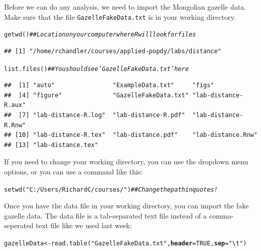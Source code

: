 \documentclass[12pt]{article}\usepackage[]{graphicx}\usepackage[]{color}
\makeatletter
\newcommand{\hlnum}[1]{\textcolor[rgb]{0.69,0.494,0}{#1}}%
\newcommand{\hlstr}[1]{\textcolor[rgb]{0.749,0.012,0.012}{#1}}%
\newcommand{\hlcom}[1]{\textcolor[rgb]{0.514,0.506,0.514}{\textit{#1}}}%
\newcommand{\hlstd}[1]{\textcolor[rgb]{0,0,0}{#1}}%
\newcommand{\hlkwb}[1]{\textcolor[rgb]{0,0.341,0.682}{#1}}%
\newcommand{\hlkwc}[1]{\textcolor[rgb]{0,0,0}{\textbf{#1}}}%
\newcommand{\hlkwd}[1]{\textcolor[rgb]{0.004,0.004,0.506}{#1}}%
\newenvironment{kframe}{%
 \def\at@end@of@kframe{}%
 \ifinner\ifhmode%
  \def\at@end@of@kframe{\end{minipage}}%
  \begin{minipage}{\columnwidth}%
 \fi\fi%
 \def\FrameCommand##1{\hskip\@totalleftmargin \hskip-\fboxsep
 \colorbox{shadecolor}{##1}\hskip-\fboxsep
     \hskip-\linewidth \hskip-\@totalleftmargin \hskip\columnwidth}%
 \MakeFramed {\advance\hsize-\width
   \@totalleftmargin\z@ \linewidth\hsize
   \@setminipage}}%
 {\par\unskip\endMakeFramed%
 \at@end@of@kframe}
\newenvironment{knitrout}{}{} %
\makeatother
\begin{document}
Before we can do any analysis, we need to import the Mongolian gazelle
data. Make sure that the file \texttt{GazelleFakeData.txt} is in your
working directory.

\begin{knitrout}
\color{fgcolor}\begin{kframe}
\begin{alltt}
\hlkwd{getwd}\hlstd{()}       \hlcom{## Location on your computer where R will look for files}
\end{alltt}
\begin{verbatim}
## [1] "/home/rchandler/courses/applied-popdy/labs/distance"
\end{verbatim}
\begin{alltt}
\hlkwd{list.files}\hlstd{()}  \hlcom{## You should see 'GazelleFakeData.txt' here}
\end{alltt}
\begin{verbatim}
##  [1] "auto"                "ExampleData.txt"     "figs"               
##  [4] "figure"              "GazelleFakeData.txt" "lab-distance-R.aux" 
##  [7] "lab-distance-R.log"  "lab-distance-R.pdf"  "lab-distance-R.Rnw" 
## [10] "lab-distance-R.tex"  "lab-distance.pdf"    "lab-distance.Rnw"   
## [13] "lab-distance.tex"
\end{verbatim}
\end{kframe}
\end{knitrout}

If you need to change your working directory, you can use the dropdown
menu options, or you can use a command like this:

\begin{knitrout}
\color{fgcolor}\begin{kframe}
\begin{alltt}
\hlkwd{setwd}\hlstd{(}\hlstr{"C:/Users/RichardC/courses/"}\hlstd{)} \hlcom{## Change the path in quotes!}
\end{alltt}
\end{kframe}
\end{knitrout}

Once you have the data file in your working directory, you can import
the fake gazelle data. The data file is a tab-separated text file
instead of a comma-seperated text file like we used last week:

\begin{knitrout}
\color{fgcolor}\begin{kframe}
\begin{alltt}
\hlstd{gazelleData} \hlkwb{<-} \hlkwd{read.table}\hlstd{(}\hlstr{"GazelleFakeData.txt"}\hlstd{,} \hlkwc{header}\hlstd{=}\hlnum{TRUE}\hlstd{,} \hlkwc{sep}\hlstd{=}\hlstr{"\textbackslash{}t"}\hlstd{)}
\end{alltt}
\end{kframe}
\end{knitrout}
\end{document}
